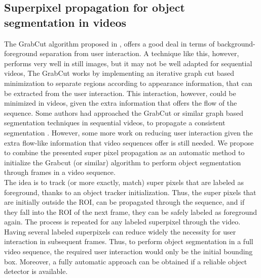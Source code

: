 \subsection{Superpixel propagation for object segmentation in videos}
The GrabCut algorithm proposed in \cite{c14}, offers a good deal in terms of
background-foreground separation from user interaction. A technique like this, however,
performs very well in still images, but it may not be well adapted for sequential videos, 
The GrabCut works by implementing an iterative graph cut based 
minimization to separate regions according to appearance information, that can be
extracted from the user interaction. This interaction, however, could be minimized in videos,
given the extra information that offers the flow of the sequence.
Some authors had approached the GrabCut or similar
graph based segmentation techniques in sequential
videos, to propagate a consistent segmentation \cite{c15}.
However, some more work on reducing user interaction given the extra flow-like information
that video sequences offer is still needed.
We propose to combine the presented super pixel
propagation as an automatic method to initialize the
Grabcut (or similar) algorithm to perform object
segmentation through frames in a video sequence. \\

The idea is to track (or more exactly, match) super
pixels that are labeled as foreground, thanks to an
object tracker initialization. Thus, the super pixels
that are initially outside the ROI, can be propagated through the sequence,
and if they fall into the ROI of the next frame, they
can be safely labeled as foreground again. The process is
repeated for any labeled superpixel through the
video. Having several labeled superpixels can reduce
widely the necessity for user interaction in
subsequent frames. Thus, to perform object
segmentation in a full video sequence, the required
user interaction would only be the initial bounding
box. Moreover, a fully automatic approach can be
obtained if a reliable object detector is available.

